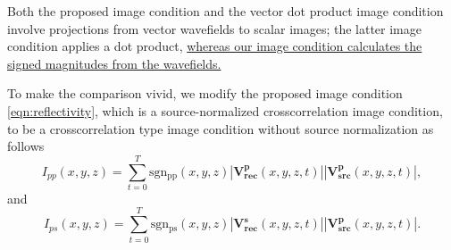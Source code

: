 \documentclass[manuscript,ulem,graphix,revised]{geophysics}
\begin{document}
%


Both the proposed image condition and the vector dot product image condition \citep{wang_cl16,zhu17,du17} involve projections from vector wavefields to scalar images; the latter image condition applies a dot product, \marginpar{[1,4,5]}\uline{whereas our image condition calculates the signed magnitudes from the wavefields.}

To make the comparison vivid, we modify the proposed image condition \ref{eqn:reflectivity}, which is a source-normalized crosscorrelation image condition, to be a crosscorrelation type image condition without source normalization as follows
\begin{equation}
I_{pp}(x,y,z)=\sum_{t=0}^{T}\mathrm{sgn_{pp}}(x,y,z)|\mathbf{V^p_{rec}}(x,y,z,t)||\mathbf{V^p_{src}}(x,y,z,t)|,
\label{eqn:crsc1}
\end{equation}
and
\begin{equation}
I_{ps}(x,y,z)=\sum_{t=0}^{T}\mathrm{sgn_{ps}}(x,y,z)|\mathbf{V^s_{rec}}(x,y,z,t)||\mathbf{V^p_{src}}(x,y,z,t)|.
\label{eqn:crsc2}
\end{equation}
\end{document}
